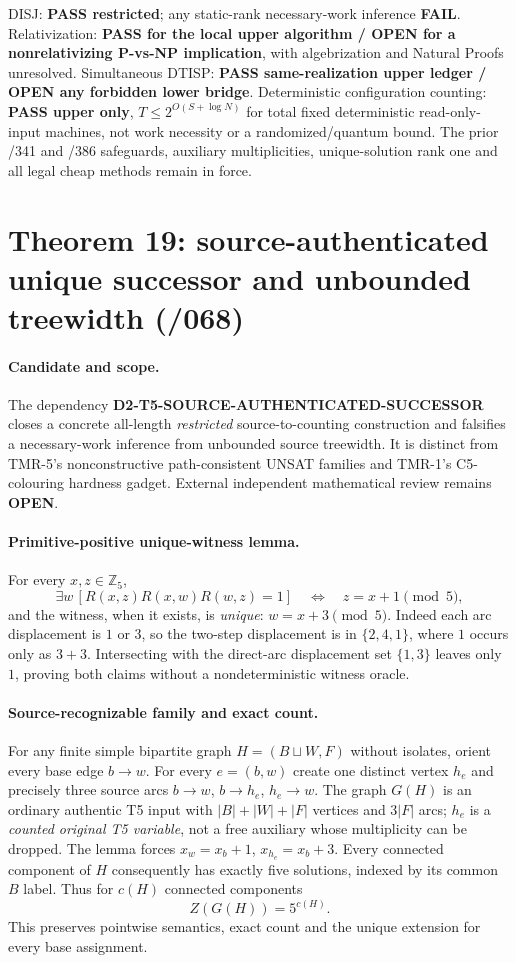 \documentclass[11pt]{article}
\begin{document}
DISJ: \textbf{PASS restricted}; any static-rank
necessary-work inference \textbf{FAIL}.
Relativization: \textbf{PASS for the local
upper algorithm / OPEN for a nonrelativizing
P-vs-NP implication}, with algebrization and
Natural Proofs unresolved. Simultaneous DTISP:
\textbf{PASS same-realization upper ledger /
OPEN any forbidden lower bridge}.
Deterministic configuration counting:
\textbf{PASS upper only},
$T\le2^{O(S+\log N)}$ for total
fixed deterministic read-only-input machines,
not work necessity or a randomized/quantum
bound. The prior /341 and /386 safeguards,
auxiliary multiplicities, unique-solution rank
one and all legal cheap methods remain in force.


\section{Theorem 19: source-authenticated unique successor and unbounded treewidth (/068)}
\paragraph{Candidate and scope.}
The dependency \textbf{D2-T5-SOURCE-AUTHENTICATED-SUCCESSOR}
closes a concrete all-length \emph{restricted} source-to-counting
construction and falsifies a necessary-work inference from
unbounded source treewidth. It is distinct from TMR-5's
nonconstructive path-consistent UNSAT families and TMR-1's
C5-colouring hardness gadget. External independent
mathematical review remains \textbf{OPEN}.

\paragraph{Primitive-positive unique-witness lemma.}
For every $x,z\in\mathbb Z_5$,
\[
 \exists w\,[R(x,z)R(x,w)R(w,z)=1]
 \quad\Longleftrightarrow\quad z=x+1\pmod5,
\]
and the witness, when it exists, is \emph{unique}:
$w=x+3\pmod5$. Indeed each arc displacement is
$1$ or $3$, so the two-step displacement is in
$\{2,4,1\}$, where $1$ occurs only as $3+3$.
Intersecting with the direct-arc displacement
set $\{1,3\}$ leaves only $1$, proving both
claims without a nondeterministic witness oracle.

\paragraph{Source-recognizable family and exact count.}
For any finite simple bipartite graph $H=(B\sqcup W,F)$
without isolates, orient every base edge $b\to w$.
For every $e=(b,w)$ create one distinct vertex
$h_e$ and precisely three source arcs
$b\to w$, $b\to h_e$, $h_e\to w$.
The graph $G(H)$ is an ordinary authentic T5 input
with $|B|+|W|+|F|$ vertices and $3|F|$ arcs;
$h_e$ is a \emph{counted original T5 variable},
not a free auxiliary whose multiplicity can be dropped.
The lemma forces
$x_w=x_b+1$, $x_{h_e}=x_b+3$.
Every connected component of $H$ consequently has
exactly five solutions, indexed by its common $B$ label.
Thus for $c(H)$ connected components
\[
 \boxed{Z(G(H))=5^{c(H)}.}
\]
This preserves pointwise semantics, exact count and
the unique extension for every base assignment.
\end{document}
